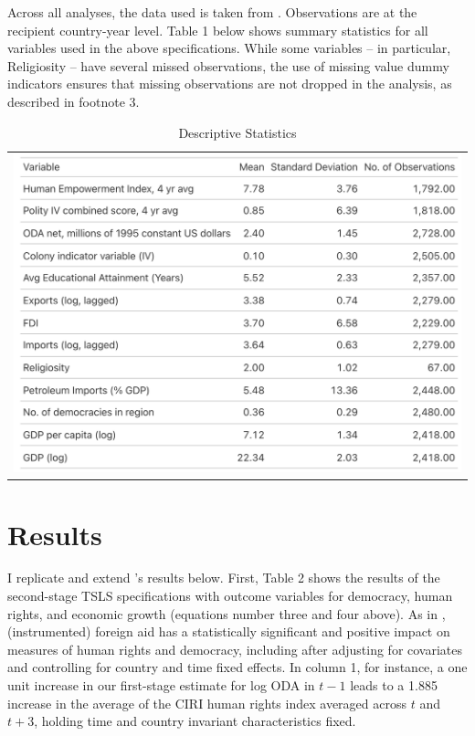 \documentclass[12pt, ]{article}
\begin{document}
Across all analyses, the data used is taken from
\citet{carnegie2017foreign}. Observations are at the recipient
country-year level. Table 1 below shows summary statistics for all
variables used in the above specifications. While some variables -- in
particular, Religiosity -- have several missed observations, the use of
missing value dummy indicators ensures that missing observations are not
dropped in the analysis, as described in footnote 3.

\hypertarget{tbl-main}{}
\begin{longtable}[]{@{}l@{}}
\caption{\label{tbl-main}Descriptive Statistics}\tabularnewline
\toprule\noalign{}
\endfirsthead
\endhead
\bottomrule\noalign{}
\endlastfoot
\includegraphics{figures/Table 1.png} \\
\end{longtable}

\hypertarget{results}{%
\section{Results}\label{results}}

I replicate and extend \citet{carnegie2017foreign}'s results below.
First, Table 2 shows the results of the second-stage TSLS specifications
with outcome variables for democracy, human rights, and economic growth
(equations number three and four above). As in
\citet{carnegie2017foreign}, (instrumented) foreign aid has a
statistically significant and positive impact on measures of human
rights and democracy, including after adjusting for covariates and
controlling for country and time fixed effects. In column 1, for
instance, a one unit increase in our first-stage estimate for log ODA in
\(t-1\) leads to a 1.885 increase in the average of the CIRI human
rights index averaged across \(t\) and \(t+3\), holding time and country
invariant characteristics fixed.
\end{document}
